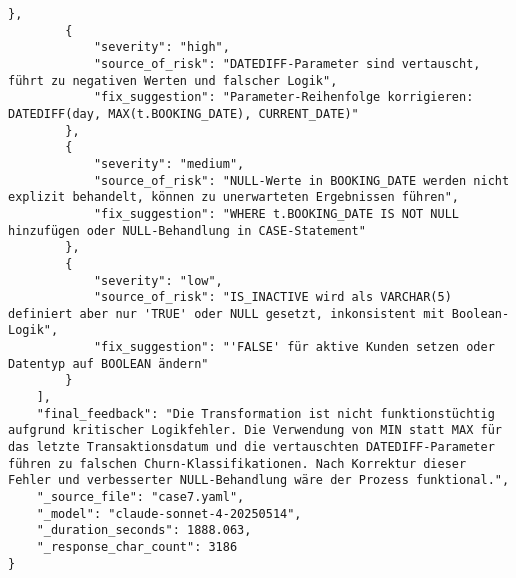 \begin{lstlisting}[caption={Ausgabe: Claude Sonnet 4 Anwendungsfall 7 Konsistenzdurchlauf},label={claude_case7_prompt2}]
        },
        {
            "severity": "high",
            "source_of_risk": "DATEDIFF-Parameter sind vertauscht, führt zu negativen Werten und falscher Logik",
            "fix_suggestion": "Parameter-Reihenfolge korrigieren: DATEDIFF(day, MAX(t.BOOKING_DATE), CURRENT_DATE)"
        },
        {
            "severity": "medium",
            "source_of_risk": "NULL-Werte in BOOKING_DATE werden nicht explizit behandelt, können zu unerwarteten Ergebnissen führen",
            "fix_suggestion": "WHERE t.BOOKING_DATE IS NOT NULL hinzufügen oder NULL-Behandlung in CASE-Statement"
        },
        {
            "severity": "low",
            "source_of_risk": "IS_INACTIVE wird als VARCHAR(5) definiert aber nur 'TRUE' oder NULL gesetzt, inkonsistent mit Boolean-Logik",
            "fix_suggestion": "'FALSE' für aktive Kunden setzen oder Datentyp auf BOOLEAN ändern"
        }
    ],
    "final_feedback": "Die Transformation ist nicht funktionstüchtig aufgrund kritischer Logikfehler. Die Verwendung von MIN statt MAX für das letzte Transaktionsdatum und die vertauschten DATEDIFF-Parameter führen zu falschen Churn-Klassifikationen. Nach Korrektur dieser Fehler und verbesserter NULL-Behandlung wäre der Prozess funktional.",
    "_source_file": "case7.yaml",
    "_model": "claude-sonnet-4-20250514",
    "_duration_seconds": 1888.063,
    "_response_char_count": 3186
}
\end{lstlisting}

